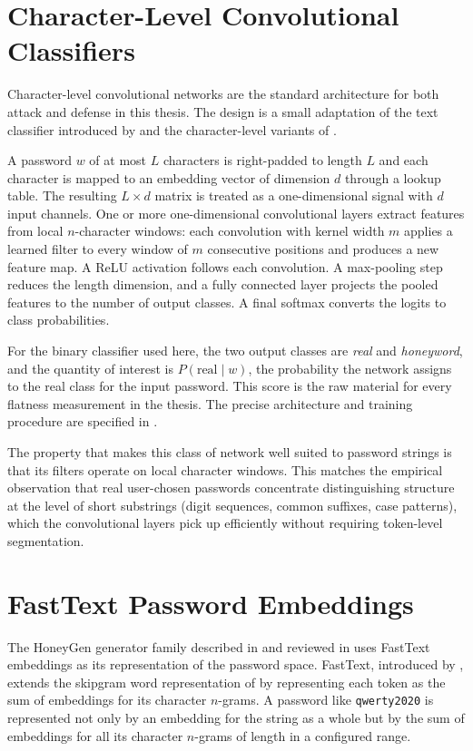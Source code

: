 \section{Character-Level Convolutional Classifiers}
\label{sec:bg-cnn}

Character-level convolutional networks are the standard architecture
for both attack and defense in this thesis. The design is a small
adaptation of the text classifier introduced by \textcite{kim2014cnn}
and the character-level variants of \textcite{zhang2015character}.

A password $w$ of at most $L$ characters is right-padded to length $L$
and each character is mapped to an embedding vector of dimension $d$
through a lookup table. The resulting $L \times d$ matrix is treated
as a one-dimensional signal with $d$ input channels. One or more
one-dimensional convolutional layers extract features from local
$n$-character windows: each convolution with kernel width $m$ applies
a learned filter to every window of $m$ consecutive positions and
produces a new feature map. A ReLU activation follows each
convolution. A max-pooling step reduces the length dimension, and a
fully connected layer projects the pooled features to the number of
output classes. A final softmax converts the logits to class
probabilities.

For the binary classifier used here, the two output classes are
\emph{real} and \emph{honeyword}, and the quantity of interest is
$P(\text{real} \mid w)$, the probability the network assigns to the
real class for the input password. This score is the raw material for
every flatness measurement in the thesis. The precise architecture and
training procedure are specified in .

The property that makes this class of network well suited to password
strings is that its filters operate on local character windows. This
matches the empirical observation that real user-chosen passwords
concentrate distinguishing structure at the level of short substrings
(digit sequences, common suffixes, case patterns), which the
convolutional layers pick up efficiently without requiring token-level
segmentation.

\section{FastText Password Embeddings}
\label{sec:bg-fasttext}

The HoneyGen generator family described in  and
reviewed in  uses FastText embeddings as its
representation of the password space. FastText, introduced by
\textcite{bojanowski2017fasttext}, extends the skipgram word
representation of \textcite{mikolov2013distributed} by representing
each token as the sum of embeddings for its character $n$-grams. A
password like \texttt{qwerty2020} is represented not only by an
embedding for the string as a whole but by the sum of embeddings for
all its character $n$-grams of length in a configured range.

